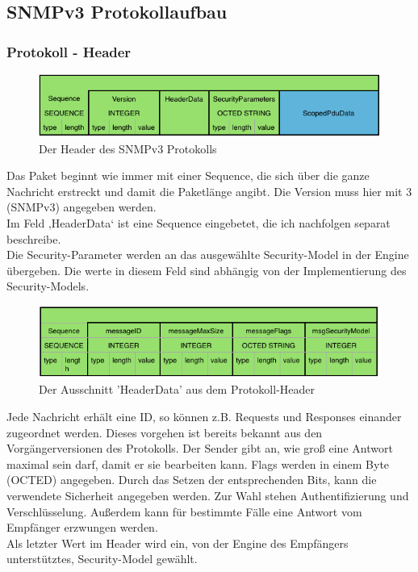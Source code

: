 \documentclass[11pt,a4paper]{article}
\begin{document}
\subsection{SNMPv3 Protokollaufbau}
\subsubsection{Protokoll - Header}
\begin{figure}[h]
	\centering
	\includegraphics[scale=.8]{Bilder/SNMPv3-Header.png}
	\caption{Der Header des SNMPv3 Protokolls}
\end{figure}
Das Paket beginnt wie immer mit einer Sequence, die sich über die ganze Nachricht erstreckt und damit die Paketlänge angibt. Die Version muss hier mit 3 (SNMPv3) angegeben werden.\\
Im Feld ‚HeaderData‘ ist eine Sequence eingebetet, die ich nachfolgen separat beschreibe.\\
Die Security-Parameter werden an das ausgewählte Security-Model in der Engine übergeben. Die werte in diesem Feld sind abhängig von der Implementierung des Security-Models.
\begin{figure}[h]
	\centering
	\includegraphics[scale=.8]{Bilder/SNMPv3-Header-Data}
	\caption{Der Ausschnitt 'HeaderData' aus dem Protokoll-Header}
\end{figure}
Jede Nachricht erhält eine ID, so können z.B. Requests und Responses einander zugeordnet werden. Dieses vorgehen ist bereits bekannt aus den Vorgängerversionen des Protokolls.
Der Sender gibt an, wie groß eine Antwort maximal sein darf, damit er sie bearbeiten kann.
Flags werden in einem Byte (OCTED) angegeben. Durch das Setzen der entsprechenden Bits, kann die verwendete Sicherheit angegeben werden. Zur Wahl stehen Authentifizierung und Verschlüsselung. Außerdem kann für bestimmte Fälle eine Antwort vom Empfänger erzwungen werden.\\
Als letzter Wert im Header wird ein, von der Engine des Empfängers unterstütztes, Security-Model gewählt.\\
\end{document}

